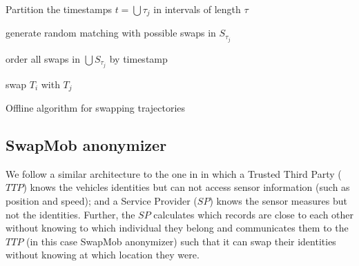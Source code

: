 \documentclass{llncs}
\begin{document}
\begin{algorithm}[t]
\SetAlgoNoLine
{}

Partition the timestamps $t =\bigcup \tau_j$ in intervals of length $\tau$

generate random matching with possible swaps in $S_{\tau_j}$\

order all swaps in $\bigcup S_{\tau_j}$ by timestamp\

{swap $T_i$ with $T_j$}

\caption{Offline algorithm for swapping trajectories}
\label{alg:one}
\end{algorithm}


\subsection{SwapMob anonymizer}

We follow a similar architecture to the one in \cite{Hoh06} in which a Trusted Third Party ($TTP$) knows the
vehicles identities but can not access sensor information (such as position and  speed); and a Service Provider ($SP$) knows the sensor measures but not the identities.
Further, the $SP$ calculates which records are close to each other without knowing to which individual they belong and communicates them to the $TTP$ (in this case SwapMob anonymizer) such that it can swap their identities without knowing at which location they were.
\end{document}
